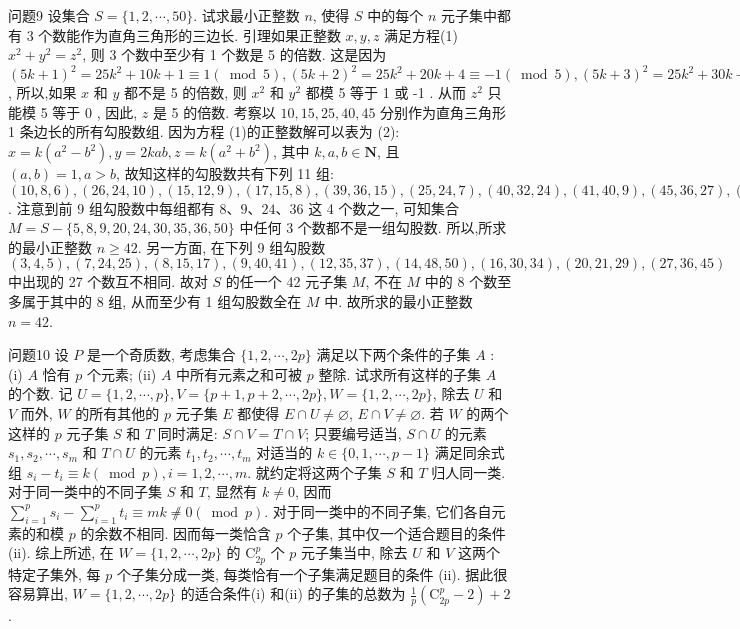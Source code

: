 问题9 设集合 $S=\{1,2, \cdots, 50\}$. 试求最小正整数 $n$, 使得 $S$ 中的每个 $n$ 元子集中都有 3 个数能作为直角三角形的三边长.
引理如果正整数 $x, y, z$ 满足方程(1) $x^2+y^2=z^2$, 则 3 个数中至少有 1 个数是 5 的倍数.
这是因为 $(5 k+1)^2=25 k^2+10 k+1 \equiv 1(\bmod 5),(5 k+ 2)^2=25 k^2+20 k+4 \equiv-1(\bmod 5),(5 k+3)^2=25 k^2+30 k+9 \equiv-1(\bmod 5), (5 k+4)^2=25 k^2+40 k+16 \equiv 1(\bmod 5)$, 所以,如果 $x$ 和 $y$ 都不是 5 的倍数, 则 $x^2$ 和 $y^2$ 都模 5 等于 1 或 -1 . 从而 $z^2$ 只能模 5 等于 0 , 因此, $z$ 是 5 的倍数.
考察以 $10,15,25,40,45$ 分别作为直角三角形 1 条边长的所有勾股数组.
因为方程 (1)的正整数解可以表为 (2): $x=k\left(a^2-b^2\right), y=2 k a b, z=k\left(a^2+b^2\right)$, 其中 $k, a, b \in \mathbf{N}$, 且 $(a, b)=1, a>b$, 故知这样的勾股数共有下列 11 组: $(10,8,6),(26,24,10),(15,12,9),(17,15,8),(39,36,15),(25,24,7),(40,32,24),(41,40,9),(45,36,27),(25,20,15),(50,40,30)$. 注意到前 9 组勾股数中每组都有 $8 、 9 、 24 、 36$ 这 4 个数之一, 可知集合 $M=S-\{5,8,9,20,24,30,35,36,50\}$ 中任何 3 个数都不是一组勾股数.
所以,所求的最小正整数 $n \geqslant 42$.
另一方面, 在下列 9 组勾股数 $(3,4,5),(7,24,25),(8,15,17),(9, 40,41),(12,35,37),(14,48,50),(16,30,34),(20,21,29),(27, 36,45)$ 中出现的 27 个数互不相同.
故对 $S$ 的任一个 42 元子集 $M$, 不在 $M$ 中的 8 个数至多属于其中的 8 组, 从而至少有 1 组勾股数全在 $M$ 中.
故所求的最小正整数 $n=42$.



问题10 设 $P$ 是一个奇质数, 考虑集合 $\{1,2, \cdots, 2 p\}$ 满足以下两个条件的子集 $A$ :
(i) $A$ 恰有 $p$ 个元素;
(ii) $A$ 中所有元素之和可被 $p$ 整除.
试求所有这样的子集 $A$ 的个数.
记 $U=\{1,2, \cdots, p\}, V=\{p+1, p+2, \cdots, 2 p\}, W=\{1,2, \cdots, 2 p\}$, 除去 $U$ 和 $V$ 而外, $W$ 的所有其他的 $p$ 元子集 $E$ 都使得 $E \cap U \neq \varnothing$, $E \cap V \neq \varnothing$. 若 $W$ 的两个这样的 $p$ 元子集 $S$ 和 $T$ 同时满足: $S \cap V=T \cap V$; 只要编号适当, $S \cap U$ 的元素 $s_1, s_2, \cdots, s_m$ 和 $T \cap U$ 的元素 $t_1, t_2, \cdots, t_m$ 对适当的 $k \in\{0,1, \cdots, p-1\}$ 满足同余式组 $s_i-t_i \equiv k(\bmod p), i=1,2, \cdots, m$. 就约定将这两个子集 $S$ 和 $T$ 归人同一类.
对于同一类中的不同子集 $S$ 和 $T$, 显然有 $k \neq 0$, 因而 $\sum_{i=1}^p s_i-\sum_{i=1}^p t_i \equiv m k \not \neq 0(\bmod p)$. 对于同一类中的不同子集, 它们各自元素的和模 $p$ 的余数不相同.
因而每一类恰含 $p$ 个子集, 其中仅一个适合题目的条件(ii).
综上所述, 在 $W=\{1,2, \cdots, 2 p\}$ 的 $\mathrm{C}_{2 p}^p$ 个 $p$ 元子集当中, 除去 $U$ 和 $V$ 这两个特定子集外, 每 $p$ 个子集分成一类, 每类恰有一个子集满足题目的条件 (ii). 据此很容易算出, $W=\{1,2, \cdots, 2 p\}$ 的适合条件(i) 和(ii) 的子集的总数为 $\frac{1}{p}\left(\mathrm{C}_{2 p}^p-2\right)+2$.



